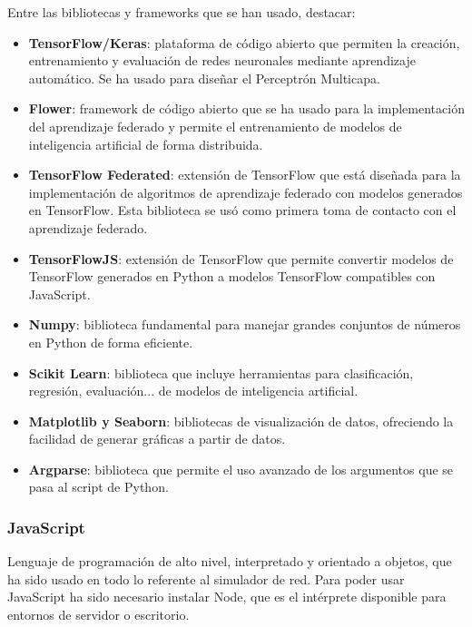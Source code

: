 Entre las bibliotecas y frameworks que se han usado, destacar:
\begin{itemize}
    \item \textbf{TensorFlow/Keras}: plataforma de código abierto que permiten la creación, entrenamiento y evaluación de redes neuronales mediante aprendizaje automático. Se ha usado para diseñar el Perceptrón Multicapa.
    \item \textbf{Flower}: framework de código abierto que se ha usado para la implementación del aprendizaje federado y permite el entrenamiento de modelos de inteligencia artificial de forma distribuida.
    \item \textbf{TensorFlow Federated}: extensión de TensorFlow que está diseñada para la implementación de algoritmos de aprendizaje federado con modelos generados en TensorFlow. Esta biblioteca se usó como primera toma de contacto con el aprendizaje federado.
    \item \textbf{TensorFlowJS}: extensión de TensorFlow que permite convertir modelos de TensorFlow generados en Python a modelos TensorFlow compatibles con JavaScript.
    \item \textbf{Numpy}: biblioteca fundamental para manejar grandes conjuntos de números en Python de forma eficiente.
    \item \textbf{Scikit Learn}: biblioteca que incluye herramientas para clasificación, regresión, evaluación... de modelos de inteligencia artificial.
    \item \textbf{Matplotlib y Seaborn}: bibliotecas de visualización de datos, ofreciendo la facilidad de generar gráficas a partir de datos.
    \item \textbf{Argparse}: biblioteca que permite el uso avanzado de los argumentos que se pasa al script de Python.
\end{itemize}

\subsubsection{JavaScript}
\label{subsubsec:JavaScript}
Lenguaje de programación de alto nivel, interpretado y orientado a objetos, que ha sido usado en todo lo referente al simulador de red. Para poder usar JavaScript ha sido necesario instalar Node, que es el intérprete disponible para entornos de servidor o escritorio.

